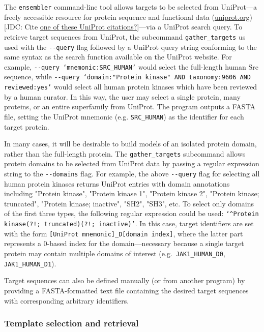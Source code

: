 \documentclass[aps,pre,twocolumn,nofootinbib,superscriptaddress,linenumbers]{revtex4-1}
\begin{document}
The {\tt ensembler} command-line tool allows targets to be selected from UniProt---a freely accessible resource for protein sequence and functional data (\href{http://www.uniprot.org/}{uniprot.org}) {\color{red}[JDC: Cite \href{http://www.uniprot.org/help/publications}{one of these UniProt citations?}]}---via a UniProt search query.
To retrieve target sequences from UniProt, the subcommand {\tt gather\_targets} us used with the {\tt -{}-query} flag followed by a UniProt query string conforming to the same syntax as the search function available on the UniProt website.
For example, {\tt -{}-query `mnemonic:SRC\_HUMAN'} would select the full-length human Src sequence, while {\tt -{}-query `domain:"Protein kinase" AND taxonomy:9606 AND reviewed:yes'} would select all human protein kinases which have been reviewed by a human curator.
In this way, the user may select a single protein, many proteins, or an entire superfamily from UniProt.
The program outputs a FASTA file, setting the UniProt mnemonic (e.g. {\tt SRC\_HUMAN}) as the identifier for each target protein.

In many cases, it will be desirable to build models of an isolated protein domain, rather than the full-length protein.
The {\tt gather\_targets} subcommand allows protein domains to be selected from UniProt data by passing a regular expression string to the {\tt -{}-domains} flag. 
For example, the above {\tt -{}-query} flag for selecting all human protein kinases returns UniProt entries with domain annotations including "Protein kinase", "Protein kinase 1", "Protein kinase 2", "Protein kinase; truncated", "Protein kinase; inactive", "SH2", "SH3", etc.
To select only domains of the first three types, the following regular expression could be used: {\tt`\^{}Protein kinase(?!; truncated)(?!; inactive)'}.
In this case, target identifiers are set with the form {\tt [UniProt mnemonic]\_D[domain index]}, where the latter part represents a 0-based index for the domain---necessary because a single target protein may contain multiple domains of interest (e.g.~{\tt JAK1\_HUMAN\_D0}, {\tt JAK1\_HUMAN\_D1}).

Target sequences can also be defined manually (or from another program) by providing a FASTA-formatted text file containing the desired target sequences with corresponding arbitrary identifiers.

\subsubsection*{Template selection and retrieval}
\end{document}
